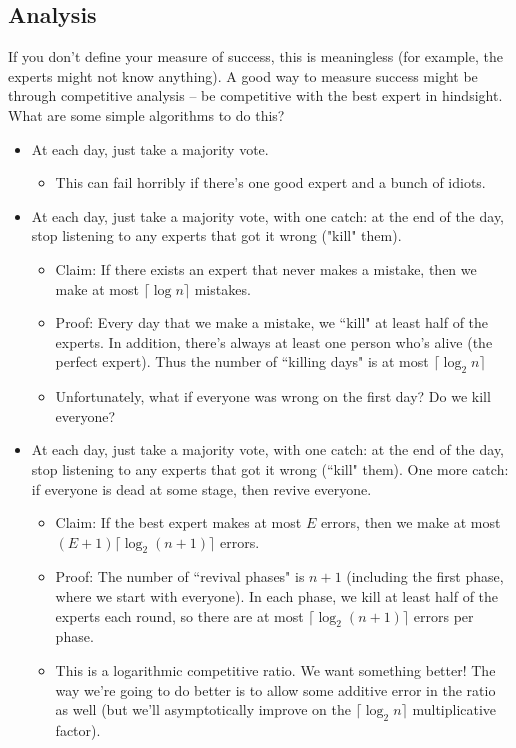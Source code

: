 \documentclass[11pt]{article}
\begin{document}
\subsection{Analysis}
If you don't define your measure of success, this is meaningless (for example, the experts might not know anything). A good way to measure success might be through competitive analysis -- be competitive with the best expert in hindsight.\medskip\\
What are some simple algorithms to do this?
\begin{itemize}
\item At each day, just take a majority vote.
\begin{itemize}
\item This can fail horribly if there's one good expert and a bunch of idiots.
\end{itemize}
\item At each day, just take a majority vote, with one catch: at the end of the day, stop listening to any experts that got it wrong ("kill" them).
\begin{itemize}
\item Claim: If there exists an expert that never makes a mistake, then we make at most $\lceil\log n\rceil$ mistakes.
\item Proof: Every day that we make a mistake, we ``kill" at least half of the experts. In addition, there's always at least one person who's alive (the perfect expert). Thus the number of ``killing days" is at most $\lceil\log_2 n\rceil$
\item Unfortunately, what if everyone was wrong on the first day? Do we kill everyone?
\end{itemize}
\item At each day, just take a majority vote, with one catch: at the end of the day, stop listening to any experts that got it wrong (``kill" them). One more catch: if everyone is dead at some stage, then revive everyone.
\begin{itemize}
\item Claim: If the best expert makes at most $E$ errors, then we make at most $(E+1)\lceil\log_2 (n+1)\rceil$ errors.
\item Proof: The number of ``revival phases" is $n+1$ (including the first phase, where we start with everyone). In each phase, we kill at least half of the experts each round, so there are at most $\lceil\log_2 (n+1)\rceil$ errors per phase.
\item This is a logarithmic competitive ratio. We want something better! The way we're going to do better is to allow some additive error in the ratio as well (but we'll asymptotically improve on the $\lceil\log_2 n\rceil$ multiplicative factor).
\end{itemize}
\end{itemize}
\end{document}
